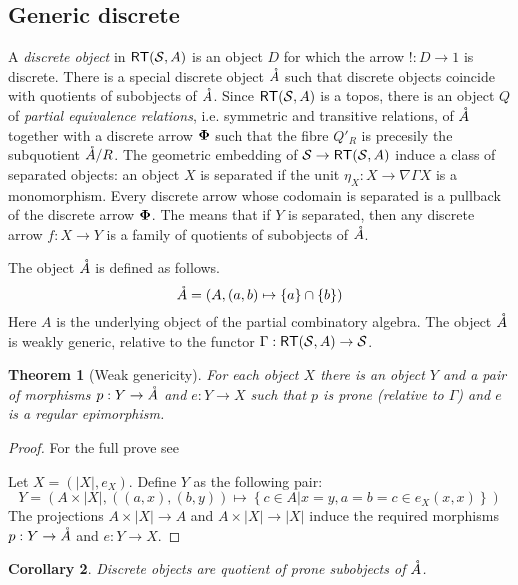 \documentclass{amsart}
\theoremstyle{plain}
\newtheorem{theorem}{Theorem}
\newtheorem{corol}[theorem]{Corollary}
\theoremstyle{definition}
\newcommand\cat\mathcal
\newcommand\set[1]{\left\{#1\right\}}
\begin{document}
\subsection{Generic discrete}
A \emph{discrete object} in $\rt(\cat S,A)$ is an object $D$ for which the arrow $!:D\to 1$ is discrete. There is a special discrete object ${\mathring A}$ such that discrete objects coincide with quotients of subobjects of ${\mathring A}$. Since $\rt(\cat S,A)$ is a topos, there is an object $Q$ of \emph{partial equivalence relations}, i.e. symmetric and transitive relations, of ${\mathring A}$ together with a discrete arrow ${\bf\Phi}$ such that the fibre $Q'_R$ is precesily the subquotient ${\mathring A}/R$. The geometric embedding of $\cat S\to\rt(\cat S,A)$ induce a class of separated objects: an object $X$ is separated if the unit $\eta_X:X\to\nabla\Gamma X$ is a monomorphism. Every discrete arrow whose codomain is separated is a pullback of the discrete arrow ${\bf\Phi}$.
The means that if $Y$ is separated, then any discrete arrow $f:X\to Y$ is a family of quotients of subobjects of ${\mathring A}$. 

The object ${\mathring A}$ is defined as follows.
\[ \genpa= (A,(a,b)\mapsto \set a\cap \set b) \]
Here $A$ is the underlying object of the partial combinatory algebra. The object ${\mathring A}$ is weakly generic, relative to the functor $\Gamma:\rt(\cat S,A) \to\cat S$.

\begin{theorem}[Weak genericity] For each object $X$ there is an object $Y$ and a pair of morphisms $p:Y\to {\mathring A}$ and $e:Y\to X$ such that $p$ is prone (relative to $\Gamma$) and $e$ is a regular epimorphism. \end{theorem}

\begin{proof} For the full prove see%

Let $X= (|X|,e_X)$. Define $Y$ as the following pair:
\[ Y = (A\times |X|, ((a,x), (b,y))\mapsto \set{c\in A|x=y, a=b=c\in e_X(x,x) } )\]
The projections $A\times |X|\to A$ and $A\times|X|\to|X|$ induce the required morphisms $p:Y\to {\mathring A}$ and $e:Y\to X$.
\end{proof}

\begin{corol} Discrete objects are quotient of prone subobjects of ${\mathring A}$. \end{corol}
\end{document}
